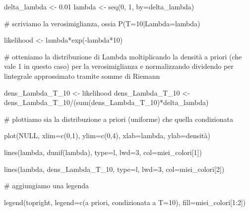 \documentclass[
  italian,
  letterpaper,
]{book}
\newenvironment{Shaded}{\begin{snugshade}}{\end{snugshade}}
\newcommand{\AttributeTok}[1]{\textcolor[rgb]{0.40,0.45,0.13}{#1}}
\newcommand{\CommentTok}[1]{\textcolor[rgb]{0.37,0.37,0.37}{#1}}
\newcommand{\ConstantTok}[1]{\textcolor[rgb]{0.56,0.35,0.01}{#1}}
\newcommand{\DecValTok}[1]{\textcolor[rgb]{0.68,0.00,0.00}{#1}}
\newcommand{\FloatTok}[1]{\textcolor[rgb]{0.68,0.00,0.00}{#1}}
\newcommand{\FunctionTok}[1]{\textcolor[rgb]{0.28,0.35,0.67}{#1}}
\newcommand{\NormalTok}[1]{\textcolor[rgb]{0.00,0.23,0.31}{#1}}
\newcommand{\OtherTok}[1]{\textcolor[rgb]{0.00,0.23,0.31}{#1}}
\newcommand{\SpecialCharTok}[1]{\textcolor[rgb]{0.37,0.37,0.37}{#1}}
\newcommand{\StringTok}[1]{\textcolor[rgb]{0.13,0.47,0.30}{#1}}
\theoremstyle{definition}
\theoremstyle{remark}
\begin{document}
\begin{Shaded}
\begin{Highlighting}[]
\NormalTok{delta\_lambda }\OtherTok{\textless{}{-}} \FloatTok{0.01}
\NormalTok{lambda }\OtherTok{\textless{}{-}} \FunctionTok{seq}\NormalTok{(}\DecValTok{0}\NormalTok{, }\DecValTok{1}\NormalTok{, }\AttributeTok{by=}\NormalTok{delta\_lambda)}

\CommentTok{\# scriviamo la verosimiglianza, ossia P(T=10|Lambda=lambda)}

\NormalTok{likelihood }\OtherTok{\textless{}{-}}\NormalTok{ lambda}\SpecialCharTok{*}\FunctionTok{exp}\NormalTok{(}\SpecialCharTok{{-}}\NormalTok{lambda}\SpecialCharTok{*}\DecValTok{10}\NormalTok{)}

\CommentTok{\# otteniamo la distribuzione di Lambda moltiplicando la densità a priori (che vale 1 in questo caso) per la verosimiglianza e normalizzando dividendo per l\textquotesingle{}integrale approssimato tramite somme di Riemann}

\NormalTok{dens\_Lambda\_T\_10 }\OtherTok{\textless{}{-}}\NormalTok{ likelihood}
\NormalTok{dens\_Lambda\_T\_10 }\OtherTok{\textless{}{-}}\NormalTok{ dens\_Lambda\_T\_10}\SpecialCharTok{/}\NormalTok{(}\FunctionTok{sum}\NormalTok{(dens\_Lambda\_T\_10)}\SpecialCharTok{*}\NormalTok{delta\_lambda)}

\CommentTok{\# plottiamo sia la distribuzione a priori (uniforme) che quella condizionata}

\FunctionTok{plot}\NormalTok{(}\ConstantTok{NULL}\NormalTok{, }\AttributeTok{xlim=}\FunctionTok{c}\NormalTok{(}\DecValTok{0}\NormalTok{,}\DecValTok{1}\NormalTok{), }\AttributeTok{ylim=}\FunctionTok{c}\NormalTok{(}\DecValTok{0}\NormalTok{,}\DecValTok{4}\NormalTok{), }\AttributeTok{xlab=}\StringTok{\textquotesingle{}lambda\textquotesingle{}}\NormalTok{, }\AttributeTok{ylab=}\StringTok{\textquotesingle{}densità\textquotesingle{}}\NormalTok{)}

\FunctionTok{lines}\NormalTok{(lambda, }\FunctionTok{dunif}\NormalTok{(lambda), }\AttributeTok{type=}\StringTok{\textquotesingle{}l\textquotesingle{}}\NormalTok{, }\AttributeTok{lwd=}\DecValTok{3}\NormalTok{, }\AttributeTok{col=}\NormalTok{miei\_colori[}\DecValTok{1}\NormalTok{])}

\FunctionTok{lines}\NormalTok{(lambda, dens\_Lambda\_T\_10, }\AttributeTok{type=}\StringTok{\textquotesingle{}l\textquotesingle{}}\NormalTok{, }\AttributeTok{lwd=}\DecValTok{3}\NormalTok{, }\AttributeTok{col=}\NormalTok{miei\_colori[}\DecValTok{2}\NormalTok{])}



\CommentTok{\# aggiungiamo una legenda}

\FunctionTok{legend}\NormalTok{(}\StringTok{\textquotesingle{}topright\textquotesingle{}}\NormalTok{, }\AttributeTok{legend=}\FunctionTok{c}\NormalTok{(}\StringTok{\textquotesingle{}a priori\textquotesingle{}}\NormalTok{, }\StringTok{\textquotesingle{}condizionata a T=10\textquotesingle{}}\NormalTok{), }\AttributeTok{fill=}\NormalTok{miei\_colori[}\DecValTok{1}\SpecialCharTok{:}\DecValTok{2}\NormalTok{])}
\end{Highlighting}
\end{Shaded}
\end{document}

